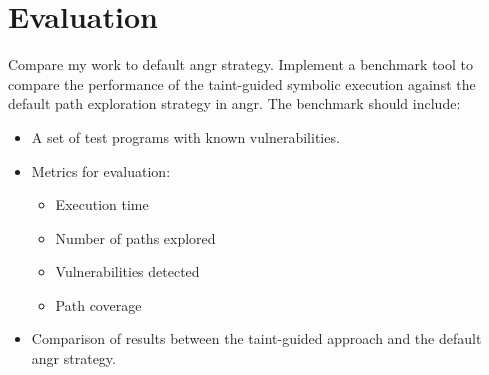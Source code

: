 \chapter{Evaluation}

Compare my work to default angr strategy. Implement a benchmark tool to compare the performance of the taint-guided symbolic execution against the default path exploration strategy in angr. The benchmark should include:
\begin{itemize}
    \item A set of test programs with known vulnerabilities.
    \item Metrics for evaluation:
    \begin{itemize}
        \item Execution time
        \item Number of paths explored
        \item Vulnerabilities detected
        \item Path coverage
    \end{itemize}
    \item Comparison of results between the taint-guided approach and the default angr strategy.
\end{itemize}
